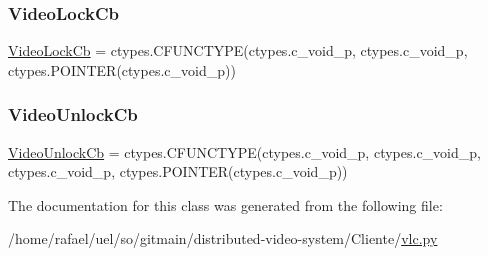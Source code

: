 \mbox{\label{classvlc_1_1_callback_decorators_a61e06dfa3da93e4c013c9491133c19aa}} 
\subsubsection{\texorpdfstring{Video\+Lock\+Cb}{VideoLockCb}}
{\footnotesize\ttfamily \hyperlink{classvlc_1_1_video_lock_cb}{Video\+Lock\+Cb} = ctypes.\+C\+F\+U\+N\+C\+T\+Y\+PE(ctypes.\+c\+\_\+void\+\_\+p, ctypes.\+c\+\_\+void\+\_\+p, ctypes.\+P\+O\+I\+N\+T\+ER(ctypes.\+c\+\_\+void\+\_\+p))\hspace{0.3cm}{\ttfamily [static]}}

\mbox{\label{classvlc_1_1_callback_decorators_aa5df1499fd4181cfb5ee5fd3d0eff991}} 
\subsubsection{\texorpdfstring{Video\+Unlock\+Cb}{VideoUnlockCb}}
{\footnotesize\ttfamily \hyperlink{classvlc_1_1_video_unlock_cb}{Video\+Unlock\+Cb} = ctypes.\+C\+F\+U\+N\+C\+T\+Y\+PE(ctypes.\+c\+\_\+void\+\_\+p, ctypes.\+c\+\_\+void\+\_\+p, ctypes.\+c\+\_\+void\+\_\+p, ctypes.\+P\+O\+I\+N\+T\+ER(ctypes.\+c\+\_\+void\+\_\+p))\hspace{0.3cm}{\ttfamily [static]}}



The documentation for this class was generated from the following file\+:\begin{DoxyCompactItemize}
\item 
/home/rafael/uel/so/gitmain/distributed-\/video-\/system/\+Cliente/\hyperlink{vlc_8py}{vlc.\+py}\end{DoxyCompactItemize}
